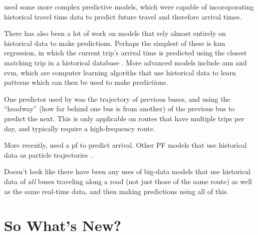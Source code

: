 \documentclass[12pt,a4paper]{article}
\begin{document}
\cite{cathey-dailey:2003} used some more complex predictive models, 
which were capable of incoroporating historical travel time
data to predict future travel and therefore arrival times.

There has also been a lot of work on models that rely almost entirely on historical 
data to make predictions.
Perhaps the simplest of these is \gls{knn} regression,
in which the current trip's arrival time is predicted using the closest
matching trip in a historical database \citep{cn}.
More advanced models include \gls{ann} and \gls{svm},
which are computer learning algoriths that use historical data to
learn patterns which can then be used to make predictions.

One predictor used by \cite{cn} was the trajectory of previous buses,
and using the ``headway'' (how far behind one bus is from another)
of the previous bus to predict the next.
This is only applicable on routes that have multiple trips per day,
and typically require a high-frequency route.


More recently, \cite{hans-etal:2015} used a \gls{pf} to predict arrival.
Other PF models that use historical data as particle trajectories
\citep{chen-rakha:2014}.


Doesn't look like there have been any uses of big-data models that use
historical data of \emph{all} buses traveling along a road
(not just those of the same route) as well as the same real-time data,
and then making predictions using all of this.












\section{So What's New?}
\label{sec:whatsnew}



\end{document}
